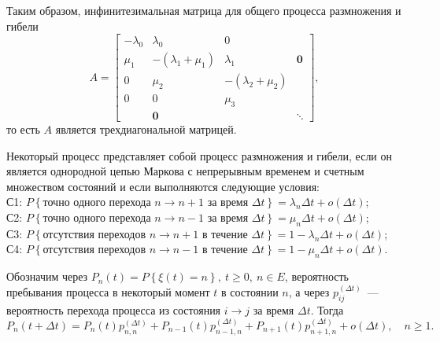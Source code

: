 Таким образом, инфинитезимальная матрица для общего процесса размножения и гибели
\[A = \left[ {\begin{array}{*{20}{c}}
{ - {\lambda _0}}&{{\lambda _0}}&0&{}\\
{{\mu _1}}&{ - \left( {{\lambda _1} + {\mu _1}} \right)}&{{\lambda _1}}&{\textbf{0}}\\
0&{{\mu _2}}&{ - \left( {{\lambda _2} + {\mu _2}} \right)}&{}\\
0&0&{{\mu _3}}&{}\\
{}&{\textbf{0}}&{}& \ddots 
\end{array}} \right] ,\]
то есть $A$ является трехдиагональной матрицей.

Некоторый процесс представляет собой процесс размножения и гибели, если он является однородной цепью Маркова с непрерывным временем и счетным множеством состояний и если выполняются следующие условия:
\medskip \\
С1: $P\left\{ {\text{точно одного перехода~} n \to n + 1 \text{~за время~} \Delta t} \right\} = {\lambda _n}\Delta t + o\left( {\Delta t} \right)$;\\
С2: $P\left\{ {\text{точно одного перехода~} n \to n - 1 \text{~за время~} \Delta t} \right\} = {\mu _n}\Delta t + o\left( {\Delta t} \right)$;\\
С3: $P\left\{ {\text{отсутствия переходов~} n \to n + 1 \text{~в течение~} \Delta t} \right\} = {1 - \lambda _n}\Delta t + o\left( {\Delta t} \right)$;\\
С4: $P\left\{ {\text{отсутствия переходов~} n \to n - 1 \text{~в течение~} \Delta t} \right\} = {1 - \mu _n}\Delta t + o\left( {\Delta t} \right)$.
\medskip

Обозначим через ${P_n}\left( t \right) = P\left\{ {\xi \left( t \right) = n} \right\},~t \ge 0,~n \in E$, вероятность пребывания процесса в некоторый момент $t$ в состоянии $n$, а через $p_{ij}^{\left( {\Delta t} \right)}$~--- вероятность перехода процесса из состояния $i \to j$ за время $\Delta t$. Тогда
\[{P_n}(t + \Delta t) = {P_n}(t)p_{n,n}^{\left( {\Delta t} \right)} + {P_{n - 1}}(t)p_{n - 1,n}^{\left( {\Delta t} \right)} + {P_{n + 1}}(t)p_{n + 1,n}^{\left( {\Delta t} \right)} + o(\Delta t),\quad n \ge 1 .\]

